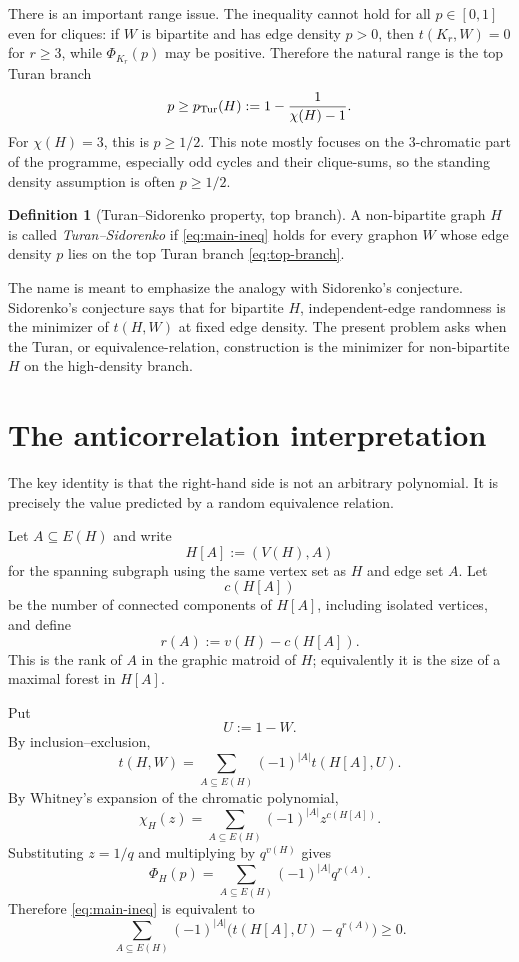 \documentclass[11pt]{article}
\theoremstyle{definition}
\newtheorem{definition}[theorem]{Definition}
\begin{document}
There is an important range issue.  The inequality cannot hold for all $p\in[0,1]$ even for cliques: if $W$ is bipartite and has edge density $p>0$, then $t(K_r,W)=0$ for $r\ge3$, while $\Phi_{K_r}(p)$ may be positive.  Therefore the natural range is the top Turan branch
\begin{equation}\label{eq:top-branch}
  p\ge p_{\rm Tur}(H):=1-\frac1{\chi(H)-1}.
\end{equation}
For $\chi(H)=3$, this is $p\ge1/2$.  This note mostly focuses on the $3$-chromatic part of the programme, especially odd cycles and their clique-sums, so the standing density assumption is often $p\ge1/2$.

\begin{definition}[Turan--Sidorenko property, top branch]
A non-bipartite graph $H$ is called \emph{Turan--Sidorenko} if \eqref{eq:main-ineq} holds for every graphon $W$ whose edge density $p$ lies on the top Turan branch \eqref{eq:top-branch}.
\end{definition}

The name is meant to emphasize the analogy with Sidorenko's conjecture.  Sidorenko's conjecture says that for bipartite $H$, independent-edge randomness is the minimizer of $t(H,W)$ at fixed edge density.  The present problem asks when the Turan, or equivalence-relation, construction is the minimizer for non-bipartite $H$ on the high-density branch.

\section{The anticorrelation interpretation}

The key identity is that the right-hand side is not an arbitrary polynomial.  It is precisely the value predicted by a random equivalence relation.

Let $A\subseteq E(H)$ and write
\[
  H[A]:=(V(H),A)
\]
for the spanning subgraph using the same vertex set as $H$ and edge set $A$.  Let
\[
  c(H[A])
\]
be the number of connected components of $H[A]$, including isolated vertices, and define
\[
  r(A):=v(H)-c(H[A]).
\]
This is the rank of $A$ in the graphic matroid of $H$; equivalently it is the size of a maximal forest in $H[A]$.

Put
\[
  U:=1-W.
\]
By inclusion--exclusion,
\begin{equation}\label{eq:IE-density}
  t(H,W)=\sum_{A\subseteq E(H)}(-1)^{|A|}t(H[A],U).
\end{equation}
By Whitney's expansion of the chromatic polynomial,
\begin{equation}\label{eq:Whitney}
  \chi_H(z)=\sum_{A\subseteq E(H)}(-1)^{|A|}z^{c(H[A])}.
\end{equation}
Substituting $z=1/q$ and multiplying by $q^{v(H)}$ gives
\begin{equation}\label{eq:Phi-expansion}
  \Phi_H(p)=\sum_{A\subseteq E(H)}(-1)^{|A|}q^{r(A)}.
\end{equation}
Therefore \eqref{eq:main-ineq} is equivalent to
\begin{equation}\label{eq:signed-deviation}
  \sum_{A\subseteq E(H)}(-1)^{|A|}\bigl(t(H[A],U)-q^{r(A)}\bigr)\ge0.
\end{equation}
\end{document}
